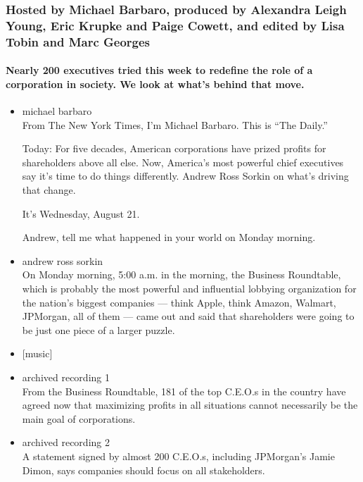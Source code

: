 \hypertarget{hosted-by-michael-barbaro-produced-by-alexandra-leigh-young-eric-krupke-and-paige-cowett-and-edited-by-lisa-tobin-and-marc-georges}{%
\subsubsection{Hosted by Michael Barbaro, produced by Alexandra Leigh
Young, Eric Krupke and Paige Cowett, and edited by Lisa Tobin and Marc
Georges}\label{hosted-by-michael-barbaro-produced-by-alexandra-leigh-young-eric-krupke-and-paige-cowett-and-edited-by-lisa-tobin-and-marc-georges}}

\hypertarget{nearly-200-executives-tried-this-week-to-redefine-the-role-of-a-corporation-in-society-we-look-at-whats-behind-that-move}{%
\paragraph{Nearly 200 executives tried this week to redefine the role of
a corporation in society. We look at what's behind that
move.}\label{nearly-200-executives-tried-this-week-to-redefine-the-role-of-a-corporation-in-society-we-look-at-whats-behind-that-move}}

\begin{itemize}
\item
  michael barbaro\\
  From The New York Times, I'm Michael Barbaro. This is ``The Daily.''

  Today: For five decades, American corporations have prized profits for
  shareholders above all else. Now, America's most powerful chief
  executives say it's time to do things differently. Andrew Ross Sorkin
  on what's driving that change.

  It's Wednesday, August 21.

  Andrew, tell me what happened in your world on Monday morning.
\item
  andrew ross sorkin\\
  On Monday morning, 5:00 a.m. in the morning, the Business Roundtable,
  which is probably the most powerful and influential lobbying
  organization for the nation's biggest companies --- think Apple, think
  Amazon, Walmart, JPMorgan, all of them --- came out and said that
  shareholders were going to be just one piece of a larger puzzle.
\item
  {[}music{]}
\item
  archived recording 1\\
  From the Business Roundtable, 181 of the top C.E.O.s in the country
  have agreed now that maximizing profits in all situations cannot
  necessarily be the main goal of corporations.
\item
  archived recording 2\\
  A statement signed by almost 200 C.E.O.s, including JPMorgan's Jamie
  Dimon, says companies should focus on all stakeholders.
\end{itemize}

